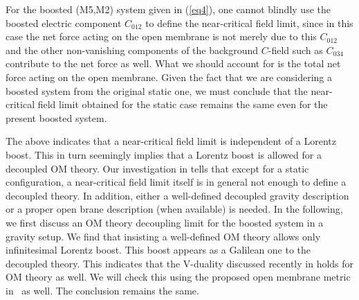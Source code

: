 \documentclass[a4paper,12pt]{article}
\begin{document}
 For the boosted (M5,M2) system given
in (\ref{eq4}), one cannot blindly use the boosted electric component 
$C_{012}$ to define the near-critical field limit, since in this case the
net force acting on the open membrane is not merely due to this $C_{012}$
and the other non-vanishing components of the background $C$-field 
such as $C_{034}$ contribute to the net force as well. What we should
account for is the total net force acting on the open membrane. Given
the fact that we are considering a boosted system from the original
static one, we must conclude that the near-critical field limit obtained
for the static case remains the same even for the present boosted
system.
 
	The above indicates that a near-critical field limit is 
independent of a Lorentz boost. This in turn seemingly implies that a
Lorentz boost is allowed for a decoupled OM theory. Our investigation
in \cite{clwone} tells that except for a static configuration, a
near-critical field limit itself is in general not enough to define a 
decoupled theory. In addition, either a well-defined decoupled gravity 
description or a proper open brane description (when available) is needed.
In the following, we first discuss an OM theory decoupling limit for the
boosted system in a gravity setup. We find that insisting a well-defined
OM theory allows only infinitesimal Lorentz boost. This boost appears as 
a Galilean one to the decoupled theory. This indicates that the 
V-duality discussed recently in \cite{CW,CLW} holds for OM theory as
well. We will check this using the proposed open membrane metric 
in~\cite{Berg,Berg2} as well. The conclusion remains the same. 
	
\end{document}
